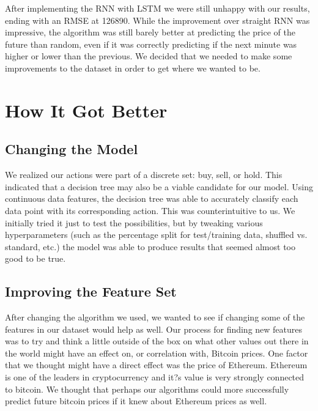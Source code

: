 \documentclass{article}
\begin{document}
After implementing the RNN with LSTM we were still unhappy with our results, ending with an RMSE at 126890.  While the improvement over straight RNN was impressive, the algorithm was still barely better at predicting the price of the future than random, even if it was correctly predicting if the next minute was higher or lower than the previous.  We decided that we needed to make some improvements to the dataset in order to get where we wanted to be. \\

\section{ How It Got Better }

\subsection{ Changing the Model }
We realized our actions were part of a discrete set: buy, sell, or hold. This indicated that a decision tree may also be a viable candidate for our model. Using continuous data features, the decision tree was able to accurately classify each data point with its corresponding action. This was counterintuitive to us. We initially tried it just to test the possibilities, but by tweaking various hyperparameters (such as the percentage split for test/training data, shuffled vs. standard, etc.) the model was able to produce results that seemed almost too good to be true.  \\

\subsection{ Improving the Feature Set }
After changing the algorithm we used, we wanted to see if changing some of the features in our dataset would help as well. Our process for finding new features was to try and think a little outside of the box on what other values out there in the world might have an effect on, or correlation with, Bitcoin prices. One factor that we thought might have a direct effect was the price of Ethereum. Ethereum is one of the leaders in cryptocurrency and it?s value is very strongly connected to bitcoin. We thought that perhaps our algorithms could more successfully predict future bitcoin prices if it knew about Ethereum prices as well. \\
\end{document}
